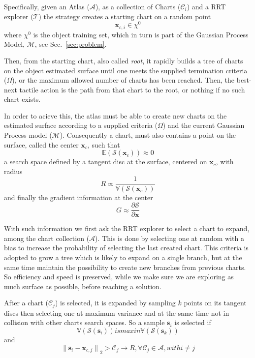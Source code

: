 Specifically, given an Atlas ($\mathcal{A}$), as a collection of Charts ($\mathcal{C}_{i}$)
and a RRT explorer ($\mathcal{T}$) the strategy creates a starting chart on a
random point 
$$
\mathbf{x}_{c,i} \in \chi^0
$$
where $\chi^0$ is the object training set,
which in turn is part of the Gaussian Process Model, $\mathcal{M}$, see Sec.~\ref{sec:problem}.

Then, from the starting chart, also called \emph{root}, it rapidly builds a tree
of charts on the object estimated surface until one meets the supplied termination
criteria ($\Omega$), or the maximum allowed number of charts has been reached.
Then, the best-next tactile action is the path from that chart to the root, or nothing if no such chart exists.

In order to acieve this, the atlas must be able to create new charts on the estimated surface
according to a supplied criteria ($\Omega$) and the current Gaussian Process model ($\mathcal{M}$).
Consequently a chart, must also contains a point on the surface, called the center $\mathbf{x}_c$,
such that
$$
\mathbb{E}(\mathcal{S}(\mathbf{x}_c)) \approx 0
$$
a search space defined by a
tangent disc at the surface, centered on $\mathbf{x}_c$, with radius 
$$
R \propto \frac{1}{\mathbb{V}(\mathcal{S}(\mathbf{x}_c))}
$$ 
and finally the gradient information at the center 
$$
G \approx \frac{\partial \mathcal{S}}{\partial \mathbf{x}}
$$

With such information we first ask the RRT explorer to select a chart to expand,
among the chart collection ($\mathcal{A}$).
This is done by selecting one at random with a bias to increase the probability
of selecting the last created chart. This criteria is adopted to grow a tree
which is likely to expand on a single branch, but at the same time maintain the
possibility to create new branches from previous charts. So efficiency and speed
is preserved, while we make sure we are exploring as much surface as possible,
before reaching a solution.

After a chart ($\mathcal{C}_j$) is selected, it is expanded by 
sampling $k$ points on its tangent discs then selecting one at maximum variance
and at the same time not in collision with other charts search spaces. 
So a sample $\mathbf{s}_i$ is selected if 
$$
\mathbb{V}(\mathcal{S}(\mathbf{s}_i)) is \mathit{max} in \mathbb{V}(\mathcal{S}(\mathbf{s}_k))
$$
and 
$$
{\parallel\mathbf{s}_i - \mathbf{x}_{c,j}\parallel}_{2} > \mathcal{C}_j \rightarrow R, \forall \mathcal{C}_j \in \mathcal{A}, with i \ne j
$$

